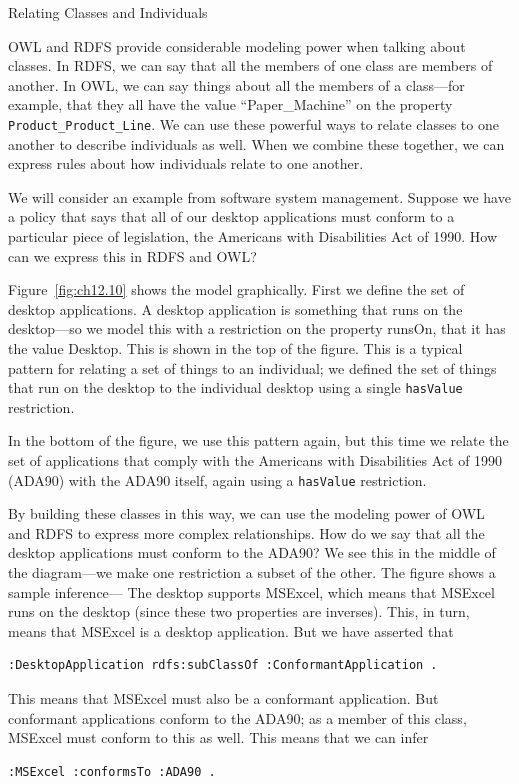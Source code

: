 \begin{challenge}{Relating Classes and Individuals}
\label{chal:25}

OWL and RDFS provide considerable modeling power when talking about
classes. In RDFS, we can say that all the members of one class are
members of another. In OWL, we can say things about all the members of a
class---for example, that they all have the value ``Paper\_Machine'' on
the property \texttt{Product\_Product\_Line}. We can use these powerful ways to
relate classes to one another to describe individuals as well. When we
combine these together, we can express rules about how individuals
relate to one another.

We will consider an example from software system management. Suppose we
have a policy that says that all of our desktop applications must
conform to a particular piece of legislation, the Americans with
Disabilities Act of 
1990. How can we express this in RDFS and OWL?

Figure~\ref{fig:ch12.10} shows the model graphically. First we define the set of
desktop applications. A desktop application is something that runs on
the desktop---so we model this with a restriction on the property
runsOn, that it has the value Desktop. This is shown in the top of the
figure. This is a typical pattern for relating a set of things to an
individual; we defined the set of things that run on the desktop to the
individual desktop using a single \texttt{hasValue} restriction.

In the bottom of the figure, we use this pattern again, but this time we
relate the set of applications that comply
with the Americans with Disabilities Act of 1990 (ADA90) with the ADA90
itself, again using a \texttt{hasValue}
restriction.

By building these classes in this way, we can use the modeling power of
OWL and RDFS to express more complex relationships. How do we say that
all the desktop applications must conform to the ADA90? We see this in
the middle of the diagram---we make one restriction a subset of the
other. The figure shows a sample inference--- The desktop supports
MSExcel, which means that MSExcel runs on the desktop (since these two
properties are inverses). This, in turn, means that MSExcel is a desktop
application. But we have asserted that

\begin{lstlisting}
:DesktopApplication rdfs:subClassOf :ConformantApplication .
\end{lstlisting}

This means that MSExcel must also be a conformant application. But
conformant applications conform to the
ADA90; as a member of this class, MSExcel must conform to this as well.
This means that we can infer

\begin{lstlisting}
:MSExcel :conformsTo :ADA90 .
\end{lstlisting}
\end{challenge}

